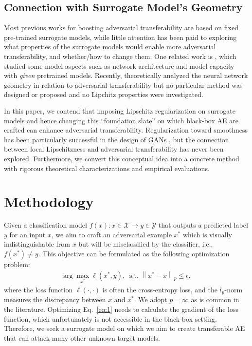 \documentclass[letterpaper]{article} %
\theoremstyle{plain}
\theoremstyle{definition}
\begin{document}
\subsection{Connection with Surrogate Model's Geometry}
Most previous works for boosting adversarial transferability are based on fixed pre-trained surrogate models, while little attention has been paid to exploring what properties of the surrogate models would enable more adversarial transferability, and whether/how to change them. One related work is \cite{wu2018understanding}, which studied some model aspects such as network architecture and model capacity with {\em given} pretrained models. Recently, \cite{charles2019geometric,tramer2017space} theoretically analyzed the neural network geometry in relation to adversarial transferability but no particular method was designed or proposed and no Lipchitz properties were investigated.

In this paper, we contend that imposing Lipschitz regularization on surrogate models and hence changing this ``foundation slate'' on which black-box AE are crafted can enhance adversarial transferability. Regularization toward smoothness has been particularly successful in the design of GANs \cite{gulrajani2017improved}, but the connection between local Lipschitzness and adversarial transferability has never been explored. Furthermore, we convert this conceptual idea into a concrete method with rigorous theoretical characterizations and empirical evaluations.

\section{Methodology} \label{sec:methodology}

Given a classification model $f(x): x \in \mathcal{X} \rightarrow y \in \mathcal{Y}$ that outputs a predicted label $y$ for an input $x$, we aim to craft an adversarial example $x^*$ which is visually indistinguishable from $x$ but will be misclassified by the classifier, i.e., $f\left(x^*\right) \neq y$. This objective can be formulated as the following optimization problem:
\vspace{-1mm}
\begin{align} \label{eq:1}
    \arg \max _{x^*} \ell\left(x^*, y\right), \;\; \text {s.t. }\left\|x^*-x\right\|_p \leq \epsilon,
\end{align}
where the loss function $\ell(\cdot, \cdot)$ is often the cross-entropy loss, and the $l_p$-norm measures the discrepancy between $x$ and $x^*$. We adopt $p=\infty$ as is common in the literature. Optimizing Eq.~\eqref{eq:1} needs to calculate the gradient of the loss function, which unfortunately is not accessible in the black-box setting. Therefore, we seek a surrogate model on which we aim to create transferable AE that can attack many other unknown target models.
\end{document}
